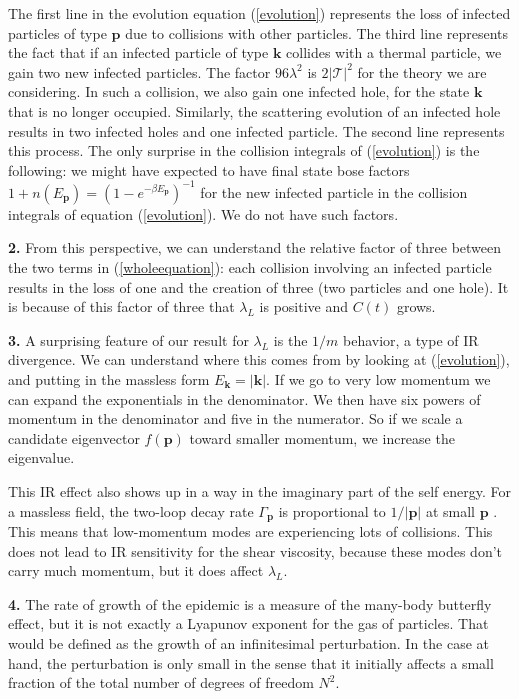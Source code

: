 \documentclass[12pt]{article}
\renewcommand{\k}{\mathbf{k}}
\newcommand{\p}{\mathbf{p}}
\begin{document}
The first line in the evolution equation (\ref{evolution}) represents the loss of infected particles of type $\p$ due to collisions with other particles. The third line represents the fact that if an infected particle of type $\k$ collides with a thermal particle, we gain two new infected particles. The factor $96\lambda^2$ is $2|\mathcal{T}|^2$ for the theory we are considering. In such a collision, we also gain one infected hole, for the state $\k$ that is no longer occupied. Similarly, the scattering evolution of an infected hole results in two infected holes and one infected particle. The second line represents this process. The only surprise in the collision integrals of (\ref{evolution}) is the following:  we might have expected to have final state bose factors $1 + n(E_\p) = (1 - e^{-\beta E_\p})^{-1}$ for the new infected particle in the collision integrals of equation (\ref{evolution}). We do not have such factors.

{\bf 2.} From this perspective, we can understand the relative factor of three between the two terms in (\ref{wholeequation}): each collision involving an infected particle results in the loss of one and the creation of three (two particles and one hole). It is because of this factor of three that $\lambda_L$ is positive and $C(t)$ grows.

{\bf 3.} A surprising feature of our result for $\lambda_L$ is the $1/m$ behavior, a type of IR divergence. We can understand where this comes from by looking at (\ref{evolution}), and putting in the massless form $E_\k = |\k|$. If we go to very low momentum we can expand the exponentials in the denominator. We then have six powers of momentum in the denominator and five in the numerator. So if we scale a candidate eigenvector $f(\p)$ toward smaller momentum, we increase the eigenvalue.

This IR effect also shows up in a way in the imaginary part of the self energy. For a massless field, the two-loop decay rate $\Gamma_\p$ is proportional to $1/|\p|$ at small $\p$ \cite{Parwani:1991gq,jeon}. This means that low-momentum modes are experiencing lots of collisions. This does not lead to IR sensitivity for the shear viscosity, because these modes don't carry much momentum, but it does affect $\lambda_L$.

{\bf 4.} The rate of growth of the epidemic is a measure of the many-body butterfly effect, but it is not exactly a Lyapunov exponent for the gas of particles. That would be defined as the growth of an infinitesimal perturbation. In the case at hand, the perturbation is only small in the sense that it initially affects a small fraction of the total number of degrees of freedom $N^2$. 
\end{document}
